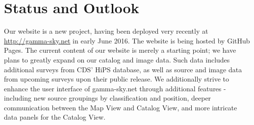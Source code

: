 \section{Status and Outlook}

%
%


    Our website is a new project, having been deployed very recently at \url{http://gamma-sky.net} in early June 2016. The website is being hosted by GitHub Pages. The current content of our website is merely a starting point; we have plans to greatly expand on our catalog and image data. Such data includes additional surveys from CDS' HiPS database, as well as source and image data from upcoming surveys upon their public release. We additionally strive to enhance the user interface of gamma-sky.net through additional features - including new source groupings by classification and position, deeper communication between the Map View and Catalog View, and more intricate data panels for the Catalog View.

